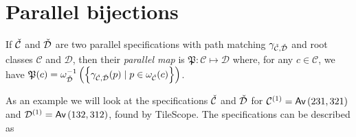 \section{Parallel bijections}
\begin{definition}
If $\check{\mathcal{C}}$ and $\check{\mathcal{D}}$ are two parallel specifications with path matching $\gamma_{\check{\mathcal{C}},\check{\mathcal{D}}}$ and root classes $\mathcal{C}$ and $\mathcal{D}$, then their \emph{parallel map} is
$\mathfrak{P}: \mathcal{C} \mapsto \mathcal{D}$ where, for any $c \in \mathcal{C}$, we have
$\mathfrak{P}(c) = \omega_{\check{\mathcal{D}}}^{-1}\left(\left\{\gamma_{\check{\mathcal{C}},\check{\mathcal{D}}}(p) \mid p \in \omega_{\check{\mathcal{C}}}(c)\right\}\right)$.
\end{definition}

As an example we will look at the specifications $\check{\mathcal{C}}$ and $\check{\mathcal{D}}$ for $\mathcal{C}^{(1)} = \textsf{Av}\left(231,321\right)$ and $\mathcal{D}^{(1)} = \textsf{Av}\left(132,312\right)$, found by TileScope. The specifications can be described as
